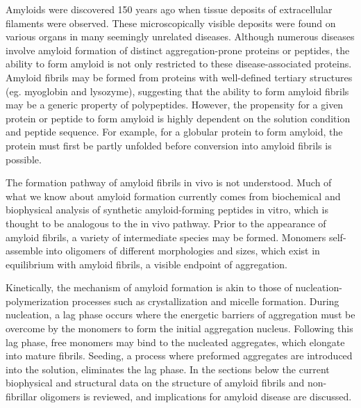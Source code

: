 Amyloids were discovered 150 years ago when tissue deposits of extracellular filaments were observed.\cite{Haass:2007db,Sipe:2000fs} These microscopically visible deposits were found on various organs in many seemingly unrelated diseases. 
Although numerous diseases involve amyloid formation of distinct aggregation-prone proteins or peptides, the ability to form amyloid is not only restricted to these disease-associated proteins. Amyloid fibrils may be formed from proteins with well-defined tertiary structures (eg. myoglobin and lysozyme), suggesting that the ability to form amyloid fibrils may be a generic property of polypeptides.\cite{Chiti:2006fz} However, the propensity for a given protein or peptide to form amyloid is highly dependent on the solution condition and peptide sequence. For example, for a globular protein to form amyloid, the protein must first be partly unfolded before conversion into amyloid fibrils is possible.\cite{Chiti:2006fz} 


The formation pathway of amyloid fibrils in vivo is not understood. Much of what we know about amyloid formation currently comes from biochemical and biophysical analysis of synthetic amyloid-forming peptides in vitro, which is thought to be analogous to the in vivo pathway. Prior to the appearance of amyloid fibrils, a variety of intermediate species may be formed.  Monomers self-assemble into oligomers of different morphologies and sizes, which exist in equilibrium with amyloid fibrils, a visible endpoint of aggregation. 

Kinetically, the mechanism of amyloid formation is akin to those of nucleation-polymerization processes such as crystallization and micelle formation.\cite{Murphy:2002fe}
During nucleation, a lag phase occurs where the energetic barriers of aggregation must be overcome by the monomers to form the initial aggregation nucleus.\cite{Murphy:2002fe} Following this lag phase, free monomers may bind to the nucleated aggregates, which elongate into mature fibrils.\cite{Murphy:2002fe} Seeding, a process where preformed aggregates are introduced into the solution, eliminates the lag phase.\cite{Harper:1997ix,Jarrett:1993vm} In the sections below the current biophysical and structural data on the structure of amyloid fibrils and non-fibrillar oligomers is reviewed, and implications for amyloid disease are discussed.

